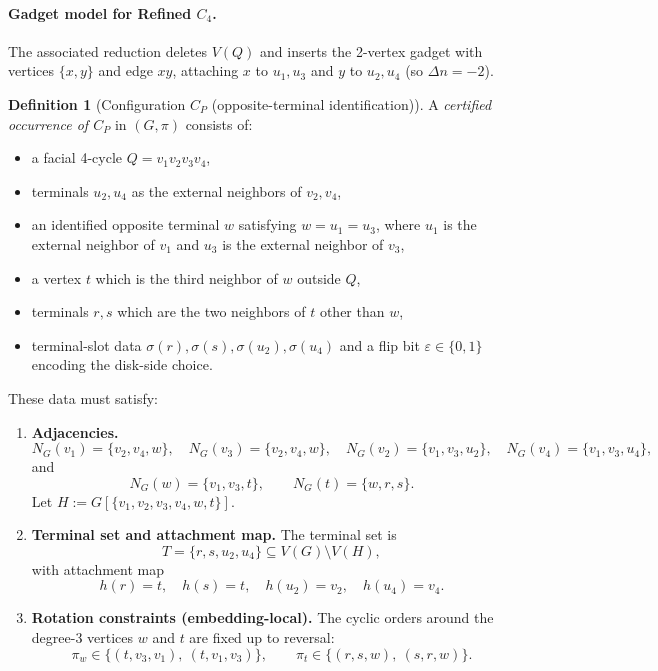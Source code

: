 \documentclass[12pt]{article}
\theoremstyle{definition}
\newtheorem{definition}[theorem]{Definition}
\newcommand{\RefinedCFourGadgetVertices}{2}
\newcommand{\RefinedCfourDelta}{-2}
\begin{document}
\paragraph{Gadget model for Refined $C_4$.}
The associated reduction deletes $V(Q)$ and inserts the \RefinedCFourGadgetVertices-vertex gadget with vertices $\{x,y\}$ and edge $xy$, attaching $x$ to $u_1,u_3$ and $y$ to $u_2,u_4$ (so $\Delta n = \RefinedCfourDelta$).

\medskip

\begin{definition}[Configuration $C_P$ (opposite-terminal identification)]
\label{def:pinchii-occ}
A \emph{certified occurrence of $C_P$} in $(G,\pi)$ consists of:

\begin{itemize}
\item a facial 4-cycle $Q=v_1v_2v_3v_4$,
\item terminals $u_2,u_4$ as the external neighbors of $v_2,v_4$,
\item an identified opposite terminal $w$ satisfying $w=u_1=u_3$, where
$u_1$ is the external neighbor of $v_1$ and $u_3$ is the external neighbor of $v_3$,
\item a vertex $t$ which is the third neighbor of $w$ outside $Q$,
\item terminals $r,s$ which are the two neighbors of $t$ other than $w$,
\item terminal-slot data $\sigma(r),\sigma(s),\sigma(u_2),\sigma(u_4)$ and a flip bit $\varepsilon\in\{0,1\}$ encoding the disk-side choice.
\end{itemize}

These data must satisfy:

\begin{enumerate}
\item \textbf{Adjacencies.}
\[
N_G(v_1)=\{v_2,v_4,w\},\quad N_G(v_3)=\{v_2,v_4,w\},\quad
N_G(v_2)=\{v_1,v_3,u_2\},\quad N_G(v_4)=\{v_1,v_3,u_4\},
\]
and
\[
N_G(w)=\{v_1,v_3,t\},\qquad N_G(t)=\{w,r,s\}.
\]
Let $H:=G[\{v_1,v_2,v_3,v_4,w,t\}]$.

\item \textbf{Terminal set and attachment map.}
The terminal set is
\[
T=\{r,s,u_2,u_4\}\subseteq V(G)\setminus V(H),
\]
with attachment map
\[
h(r)=t,\quad h(s)=t,\quad h(u_2)=v_2,\quad h(u_4)=v_4.
\]

\item \textbf{Rotation constraints (embedding-local).}
The cyclic orders around the degree-3 vertices $w$ and $t$ are fixed up to reversal:
\[
\pi_w \in \{(t,v_3,v_1),\ (t,v_1,v_3)\},\qquad
\pi_t \in \{(r,s,w),\ (s,r,w)\}.
\]


\end{enumerate}
\end{definition}
\end{document}
